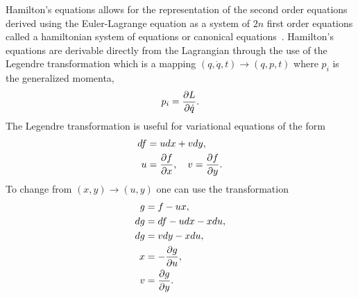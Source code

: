 Hamilton's equations allows for the representation of the second order equations derived using the Euler-Lagrange equation as a system of \( 2n \) first order equations called a hamiltonian system of equations or canonical equations~\cite{arnold1989}.
Hamilton's equations are derivable directly from the Lagrangian through the use of the Legendre transformation which is a mapping \( \left( q, \dot{q},t\right) \rightarrow \left(q, p, t \right) \) where \( p_i\) is the generalized momenta,
\begin{align}\label{eq:legendre_transform}
	p_i = \frac{\partial L}{\partial \dot{q}}.
\end{align}
The Legendre transformation is useful for variational equations of the form
\begin{align*}
	df &= u dx + v dy, \\
	u &= \frac{\partial f}{\partial x},\quad v = \frac{\partial f}{\partial y}.
\end{align*}
To change from \( \left( x, y\right) \rightarrow \left(u,y \right) \) one can use the transformation
\begin{align*}
	g &= f - u x,\\
	dg &= df - u dx - x du, \\
	dg &= v dy - x du, \\
	x&= -\frac{\partial g}{\partial u}, \\
    v&= \frac{\partial g}{\partial y}.
\end{align*}

